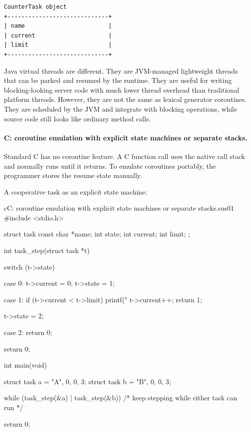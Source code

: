 \begin{verbatim}
CounterTask object
+-----------------------------+
| name                        |
| current                     |
| limit                       |
+-----------------------------+
\end{verbatim}

Java virtual threads are different. They are JVM-managed lightweight threads that can be parked and resumed by the runtime. They are useful for writing blocking-looking server code with much lower thread overhead than traditional platform threads. However, they are not the same as lexical generator coroutines. They are scheduled by the JVM and integrate with blocking operations, while source code still looks like ordinary method calls.

\paragraph{C: coroutine emulation with explicit state machines or separate stacks.}

Standard C has no coroutine feature. A C function call uses the native call stack and normally runs until it returns. To emulate coroutines portably, the programmer stores the resume state manually.

A cooperative task as an explicit state machine:

\begin{codebox}[]{c}{C: coroutine emulation with explicit state machines or separate stacks.}{sus01}
#include <stdio.h>

struct task {
    const char *name;
    int state;
    int current;
    int limit;
};

int task_step(struct task *t) {
    switch (t->state) {
        case 0:
            t->current = 0;
            t->state = 1;

        case 1:
            if (t->current < t->limit) {
                printf("%
                t->current++;
                return 1;
            }

            t->state = 2;

        case 2:
            return 0;
    }

    return 0;
}

int main(void) {
    struct task a = {"A", 0, 0, 3};
    struct task b = {"B", 0, 0, 3};

    while (task_step(&a) | task_step(&b)) {
        /* keep stepping while either task can run */
    }

    return 0;
}
\end{codebox}


